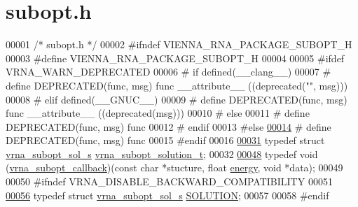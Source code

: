 \hypertarget{subopt_8h_source}{}\section{subopt.\+h}
\label{subopt_8h_source}

\begin{DoxyCode}
00001 \textcolor{comment}{/* subopt.h */}
00002 \textcolor{preprocessor}{#ifndef VIENNA\_RNA\_PACKAGE\_SUBOPT\_H}
00003 \textcolor{preprocessor}{#define VIENNA\_RNA\_PACKAGE\_SUBOPT\_H}
00004 
00005 \textcolor{preprocessor}{#ifdef VRNA\_WARN\_DEPRECATED}
00006 \textcolor{preprocessor}{# if defined(\_\_clang\_\_)}
00007 \textcolor{preprocessor}{#  define DEPRECATED(func, msg) func \_\_attribute\_\_ ((deprecated("", msg)))}
00008 \textcolor{preprocessor}{# elif defined(\_\_GNUC\_\_)}
00009 \textcolor{preprocessor}{#  define DEPRECATED(func, msg) func \_\_attribute\_\_ ((deprecated(msg)))}
00010 \textcolor{preprocessor}{# else}
00011 \textcolor{preprocessor}{#  define DEPRECATED(func, msg) func}
00012 \textcolor{preprocessor}{# endif}
00013 \textcolor{preprocessor}{#else}
\mbox{\hyperlink{subopt_8h_aab347a3c03fbe8e7319551b9fa0cce4a}{00014}} \textcolor{preprocessor}{# define DEPRECATED(func, msg) func}
00015 \textcolor{preprocessor}{#endif}
00016 
\mbox{\hyperlink{subopt_8h_a01ae9a0f27d245d89f705afd843fc457}{00031}} \textcolor{keyword}{typedef} \textcolor{keyword}{struct }\mbox{\hyperlink{structvrna__subopt__sol__s}{vrna\_subopt\_sol\_s}}   \mbox{\hyperlink{structvrna__subopt__sol__s}{vrna\_subopt\_solution\_t}};
00032 
\mbox{\hyperlink{group__subopt__wuchty_gaa0270c66d04f59e750401695b8282e04}{00048}} \textcolor{keyword}{typedef} void (\mbox{\hyperlink{group__subopt__wuchty_gaa0270c66d04f59e750401695b8282e04}{vrna\_subopt\_callback}})(\textcolor{keyword}{const} \textcolor{keywordtype}{char} *stucture, \textcolor{keywordtype}{float} 
      \mbox{\hyperlink{structvrna__subopt__sol__s_a99bc26ca68392aa4656386cf73b73fef}{energy}}, \textcolor{keywordtype}{void} *data);
00049 
00050 \textcolor{preprocessor}{#ifndef VRNA\_DISABLE\_BACKWARD\_COMPATIBILITY}
00051 
\mbox{\hyperlink{subopt_8h_aa0f46ff02e1017469cf902d02ecd7f9a}{00056}} \textcolor{keyword}{typedef} \textcolor{keyword}{struct }\mbox{\hyperlink{structvrna__subopt__sol__s}{vrna\_subopt\_sol\_s}}   \mbox{\hyperlink{structvrna__subopt__sol__s}{SOLUTION}};
00057 
00058 \textcolor{preprocessor}{#endif}

\end{DoxyCode}
